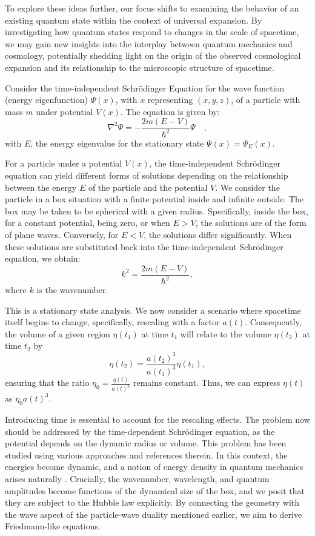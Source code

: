 \documentclass{article}
\begin{document}
To explore these ideas further, our focus shifts to examining the behavior of an existing quantum state within the context of universal expansion. By investigating how quantum states respond to changes in the scale of spacetime, we may gain new insights into the interplay between quantum mechanics and cosmology, potentially shedding light on the origin of the observed cosmological expansion and its relationship to the microscopic structure of spacetime.

Consider the time-independent Schr{\"o}dinger Equation for the wave function (energy eigenfunction) $\Psi(x)$, with $x$ representing $(x,y,z)$, of a particle with mass $m$ under potential $V(x)$. The equation is given by:
\begin{equation}
\nabla^2 \Psi = -\frac{2m(E - V)}{\hbar^2} \Psi \quad, \label{eq1Schrodinger}
\end{equation}
with $E$, the energy eigenvalue for the stationary state $\Psi(x)=\Psi_{E}(x)$.

For a particle under a potential $V(x)$, the time-independent Schr{\"o}dinger equation can yield different forms of solutions depending on the relationship between the energy $E$ of the particle and the potential $V$. We consider the particle in a box situation with a finite potential inside and infinite outside. The box may be taken to be spherical with a given radius. Specifically, inside the box, for a constant potential, being zero, or when $E > V$, the solutions are of the form of plane waves. Conversely, for $E < V$, the solutions differ significantly. When these solutions are substituted back into the time-independent Schr{\"o}dinger equation, we obtain:
\begin{equation}
k^2 = \frac{2m(E-V)}{\hbar^2}, \label{eq2KEV}
\end{equation}
where $k$ is the wavenumber. 


This is a stationary state analysis. We now consider a scenario where spacetime itself begins to change, specifically, rescaling with a factor $a(t)$. Consequently, the volume of a given region $\eta(t_1)$ at time $t_1$ will relate to the volume $\eta(t_2)$ at time $t_2$ by
\begin{equation}
\eta(t_2) = \frac{a(t_2)^3}{a(t_1)^3}\eta(t_1), \label{eq:VolumeScale}
\end{equation}
ensuring that the ratio $\eta_0 = \frac{\eta(t)}{a(t)^3}$ remains constant. Thus, we can express $\eta(t)$ as $\eta_0 a(t)^3$.

Introducing time is essential to account for the rescaling effects. The problem now should be addressed by the time-dependent Schr{\"o}dinger equation, as the potential depends on the dynamic radius or volume. This problem has been studied using various approaches \cite{Cooney} and references therein. In this context, the energies become dynamic, and a notion of energy density in quantum mechanics arises naturally \cite{francisco}. Crucially, the wavenumber, wavelength, and quantum amplitudes become functions of the dynamical size of the box, and we posit that they are subject to the Hubble law explicitly. By connecting the geometry with the wave aspect of the particle-wave duality mentioned earlier, we aim to derive Friedmann-like equations.
\end{document}
